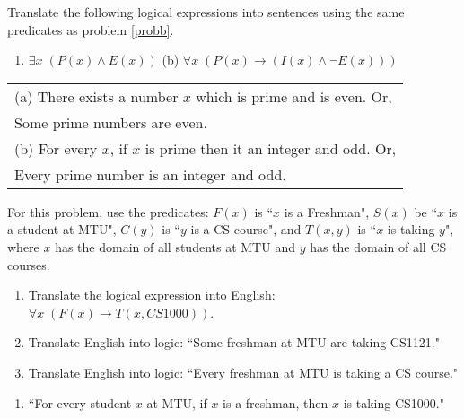 \documentclass[12pt,addpoints]{exam}
\newcommand{\ra}{\rightarrow}
\begin{document}
\begin{questions}
\question[4] Translate the following logical expressions into sentences using the same predicates as problem \ref{probb}.
\begin{enumerate}[label=(\alph*),itemsep=0pt,parsep=0pt,
	topsep=0pt,partopsep=0pt]
    \item $\exists x\; (P(x) \wedge E(x))$ \hfill (b) $\forall x\; (P(x) \ra (I(x) \wedge \neg E(x)))$ \hspace{0.3in}
\end{enumerate}
    \ifprintanswers
        \vspace{-12pt}
    \fi
\begin{solution}
    \begin{tabular}{l}
    	(a) There exists a number $x$ which is prime and is even. Or, \\
            Some prime numbers are even. \\
        (b) For every $x$, if $x$ is prime then it an integer and odd. Or, \\
            Every prime number is an integer and odd.
    \end{tabular}
\end{solution}


\question[7]\label{proba} For this problem, use the predicates: $F(x)$ is ``$x$ is a Freshman", $S(x)$ be ``$x$ is a student at MTU", $C(y)$ is ``$y$ is a CS course", and $T(x,y)$ is ``$x$ is taking $y$", where $x$ has the domain of all students at MTU and $y$ has the domain of all CS courses.
\begin{enumerate}[label=(\alph*),itemsep=0pt,parsep=0pt,
	topsep=0pt,partopsep=0pt]
    \item Translate the logical expression into English: $\forall x\; (F(x) \ra T(x,CS1000))$.
    \item Translate English into logic: ``Some freshman at MTU are taking CS1121."
    \item Translate English into logic: ``Every freshman at MTU is taking a CS course."
\end{enumerate}
    \ifprintanswers
        \vspace{-12pt}
    \fi
\begin{solution}
    \begin{enumerate}[label=(\alph*),itemsep=0pt,parsep=0pt,
    	topsep=0pt,partopsep=0pt]
        \item ``For every student $x$ at MTU, if $x$ is a freshman, then $x$ is taking CS1000."


\end{enumerate}
\end{solution}
\end{questions}
\end{document}
